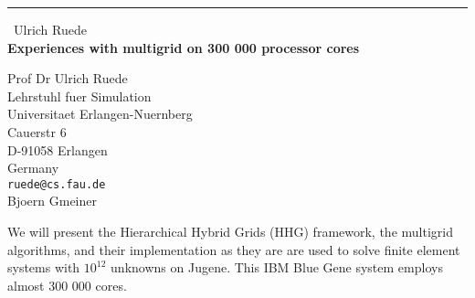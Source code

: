 \documentclass{report}
\begin{document}
\begin{center}
\rule{6in}{1pt} \
{\large Ulrich Ruede \\
{\bf Experiences with multigrid on 300 000 processor cores}}

Prof Dr Ulrich Ruede \\ Lehrstuhl fuer Simulation \\ Universitaet Erlangen-Nuernberg \\ Cauerstr 6 \\ D-91058 Erlangen \\ Germany
\\
{\tt ruede@cs.fau.de}\\
Bjoern Gmeiner\end{center}

We will present the Hierarchical Hybrid Grids (HHG) framework, the
multigrid algorithms, and their implementation as they are are used to solve finite
element systems with $10^{12}$ unknowns on Jugene. This IBM Blue Gene
system employs almost 300 000 cores.
\end{document}
